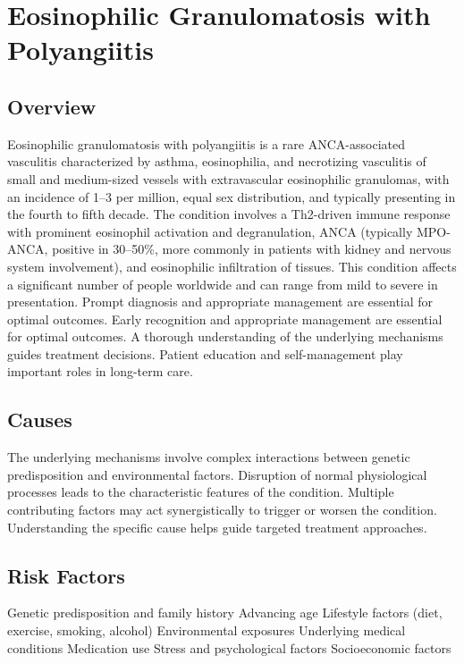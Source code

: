 \chapter{Eosinophilic Granulomatosis with Polyangiitis}
\label{sec:Eosinophilic Granulomatosis with Polyangiitis (EGPA)}

\section{Overview}
Eosinophilic granulomatosis with polyangiitis is a rare ANCA-associated vasculitis characterized by asthma, eosinophilia, and necrotizing vasculitis of small and medium-sized vessels with extravascular eosinophilic granulomas, with an incidence of 1--3 per million, equal sex distribution, and typically presenting in the fourth to fifth decade. The condition involves a Th2-driven immune response with prominent eosinophil activation and degranulation, ANCA (typically MPO-ANCA, positive in 30--50\%, more commonly in patients with kidney and nervous system involvement), and eosinophilic infiltration of tissues. This condition affects a significant number of people worldwide and can range from mild to severe in presentation. Prompt diagnosis and appropriate management are essential for optimal outcomes. Early recognition and appropriate management are essential for optimal outcomes. A thorough understanding of the underlying mechanisms guides treatment decisions. Patient education and self-management play important roles in long-term care.
\section{Causes}
The underlying mechanisms involve complex interactions between genetic predisposition and environmental factors. Disruption of normal physiological processes leads to the characteristic features of the condition. Multiple contributing factors may act synergistically to trigger or worsen the condition. Understanding the specific cause helps guide targeted treatment approaches.
\section{Risk Factors}
Genetic predisposition and family history Advancing age Lifestyle factors (diet, exercise, smoking, alcohol) Environmental exposures Underlying medical conditions Medication use Stress and psychological factors Socioeconomic factors

